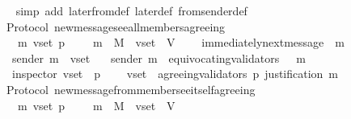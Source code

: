 \begin{isabellebody}
%
\isadelimproof
\ \ %
\endisadelimproof
%
\isatagproof
{}\isamarkupfalse%
\ {\isacharparenleft}simp\ add{\isacharcolon}\ later{\isacharunderscore}from{\isacharunderscore}def\ later{\isacharunderscore}def\ from{\isacharunderscore}sender{\isacharunderscore}def{\isacharparenright}%
\endisatagproof
{\isafoldproof}%
%
\isadelimproof
\isanewline
%
\endisadelimproof
\isanewline
\isanewline
\isanewline
\isanewline
{}\isamarkupfalse%
\ {\isacharparenleft}\ Protocol{\isacharparenright}\ new{\isacharunderscore}message{\isacharunderscore}see{\isacharunderscore}all{\isacharunderscore}members{\isacharunderscore}agreeing\ {\isacharcolon}\isanewline
\ \ {\isachardoublequoteopen}{\isasymforall}\ {\isasymsigma}\ m\ v{\isacharunderscore}set\ p{\isachardot}\ {\isasymsigma}\ {\isasymin}\ {\isasymSigma}\ {\isasymand}\ m\ {\isasymin}\ M\ {\isasymand}\ v{\isacharunderscore}set\ {\isasymsubseteq}\ V\ \isanewline
\ \ {\isasymlongrightarrow}\ immediately{\isacharunderscore}next{\isacharunderscore}message\ {\isacharparenleft}{\isasymsigma}{\isacharcomma}\ m{\isacharparenright}\isanewline
\ \ {\isasymlongrightarrow}\ sender\ m\ {\isasymin}\ v{\isacharunderscore}set\isanewline
\ \ {\isasymlongrightarrow}\ sender\ m\ {\isasymnotin}\ equivocating{\isacharunderscore}validators\ {\isacharparenleft}{\isasymsigma}\ {\isasymunion}\ {\isacharbraceleft}m{\isacharbraceright}{\isacharparenright}\isanewline
\ \ {\isasymlongrightarrow}\ inspector\ {\isacharparenleft}v{\isacharunderscore}set{\isacharcomma}\ {\isasymsigma}{\isacharcomma}\ p{\isacharparenright}\ \isanewline
\ \ {\isasymlongrightarrow}\ v{\isacharunderscore}set\ {\isasymsubseteq}\ agreeing{\isacharunderscore}validators\ {\isacharparenleft}p{\isacharcomma}\ justification\ m{\isacharparenright}{\isachardoublequoteclose}\isanewline
%
\isadelimproof
\ \ %
\endisadelimproof
%
\isatagproof
{}\isamarkupfalse%
%
\endisatagproof
{\isafoldproof}%
%
\isadelimproof
\isanewline
%
\endisadelimproof
\isanewline
\isanewline
\isanewline
\isanewline
\isanewline
{}\isamarkupfalse%
\ {\isacharparenleft}\ Protocol{\isacharparenright}\ new{\isacharunderscore}message{\isacharunderscore}from{\isacharunderscore}member{\isacharunderscore}see{\isacharunderscore}itself{\isacharunderscore}agreeing\ {\isacharcolon}\isanewline
\ \ {\isachardoublequoteopen}{\isasymforall}\ {\isasymsigma}\ m\ v{\isacharunderscore}set\ p{\isachardot}\ {\isasymsigma}\ {\isasymin}\ {\isasymSigma}\ {\isasymand}\ m\ {\isasymin}\ M\ {\isasymand}\ v{\isacharunderscore}set\ {\isasymsubseteq}\ V\ \isanewline

\end{isabellebody}
